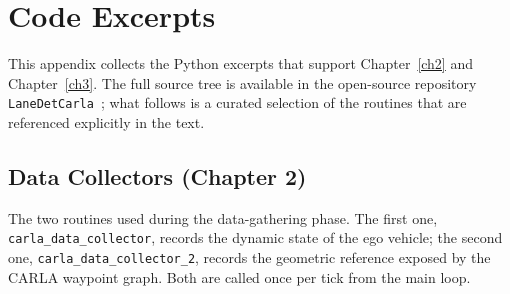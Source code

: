 %
%

\chapter{Code Excerpts}
\label{app:b}

This appendix collects the Python excerpts that support Chapter~\ref{ch2} and Chapter~\ref{ch3}. The full source tree is available in the open-source repository \texttt{LaneDetCarla}~\cite{lanedetcarla}; what follows is a curated selection of the routines that are referenced explicitly in the text.

\section{Data Collectors (Chapter 2)}
The two routines used during the data-gathering phase. The first one, \texttt{carla\_data\_collector}, records the dynamic state of the ego vehicle; the second one, \texttt{carla\_data\_collector\_2}, records the geometric reference exposed by the CARLA waypoint graph. Both are called once per tick from the main loop.

